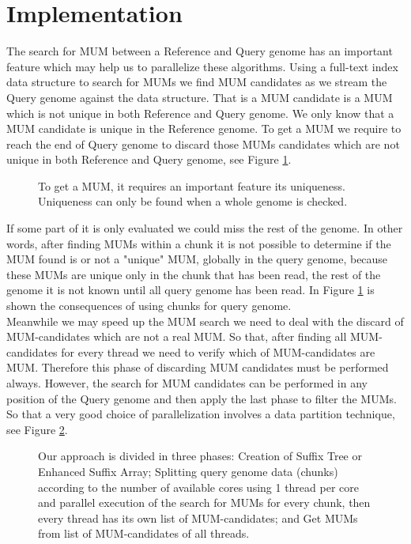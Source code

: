\documentclass{acm_proc_article-sp}
\begin{document}
\section{Implementation}
The search for MUM between a Reference and Query genome has an important feature which may help us to parallelize these algorithms. Using a full-text index data structure to search for MUMs we find MUM candidates as we stream the Query genome against the data structure. That is a MUM candidate is a MUM which is not unique in both Reference and Query genome. We only know that a MUM candidate is unique in the Reference genome. To get a MUM we require to reach the end of Query genome to discard those MUMs candidates which are not unique in both Reference and Query genome, see Figure \ref{Whole-MUM}.\\ 
\begin{figure}[h]
\centering 
\caption{To get a MUM, it requires an important feature its uniqueness. Uniqueness can only be found when a whole genome is checked.} 
\label{Whole-MUM} 
\end{figure}
If some part of it is only evaluated we could miss the rest of the genome. In other words, after finding MUMs within a chunk it is not possible to determine if the MUM found is or not a "unique" MUM, globally in the query genome,  because these MUMs are unique only in the chunk that has been read, the rest of the genome it is not known until all query genome has been read. In Figure \ref{Whole-MUM} is shown the consequences of using chunks for query genome.\\
Meanwhile we may speed up the MUM search we need to deal with the discard of MUM-candidates which are not a real MUM. So that, after finding all MUM-candidates for every thread we need to verify which of MUM-candidates are MUM. Therefore this phase of discarding MUM candidates must be performed always. However, the search for MUM candidates can be performed in any position of the Query genome and then apply the last phase to filter the MUMs. So that a very good choice of parallelization involves a data partition technique, see Figure \ref{phases}.\\
\begin{figure}[h] 
\centering 
\caption{Our approach is divided in three phases: Creation of Suffix Tree or Enhanced Suffix Array; Splitting query genome data (chunks) according to the number of available cores using 1 thread per core and parallel execution of the search for MUMs for every chunk, then every thread has its own list of MUM-candidates; and Get MUMs from list of MUM-candidates of all threads.}
  \label{phases}
\end{figure}
\end{document}
